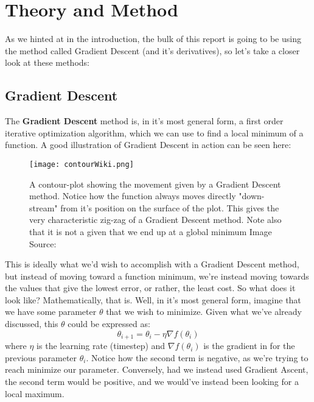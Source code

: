 \documentclass{article}
\begin{document}
\section{Theory and Method}
As we hinted at in the introduction, the bulk of this report is going to be using the method called Gradient Descent (and it's derivatives), so let's take a closer look at these methods:
\subsection{Gradient Descent}
The \textbf{Gradient Descent} method is, in it's most general form, a first order iterative optimization algorithm, which we can use to find a local minimum of a function. \newline
A good illustration of Gradient Descent in action can be seen here:
\begin{figure}[ht!]
    \centering
    \texttt{[image: contourWiki.png]}
    \caption{A contour-plot showing the movement given by a Gradient Descent method. \newline
    Notice how the function always moves directly "down-stream" from it's position on the surface of the plot. This gives the very characteristic zig-zag of a Gradient Descent method. Note also that it is not a given that we end up at a global minimum \newline
    Image Source: \cite{contourWiki} }
    \label{fig2}
\end{figure} 
This is ideally what we'd wish to accomplish with a Gradient Descent method, but instead of moving toward a function minimum, we're instead moving towards the values that give the lowest error, or rather, the least cost.
\newline
So what does it look like? Mathematically, that is. Well, in it's most general form, imagine that we have some parameter $\theta$ that we wish to minimize. Given what we've already discussed, this $\theta$ could be expressed as:
\begin{equation} \label{1}
    \theta_{i+1} = \theta_i - \eta \nabla f(\theta_i)
\end{equation}
where $\eta$ is the learning rate (timestep) and $\nabla f(\theta_i)$ is the gradient in for the previous parameter $\theta_i$. Notice how the second term is negative, as we're trying to reach minimize our parameter. Conversely, had we instead used Gradient Ascent, the second term would be positive, and we would've instead been looking for a local maximum. \newline
\end{document}
